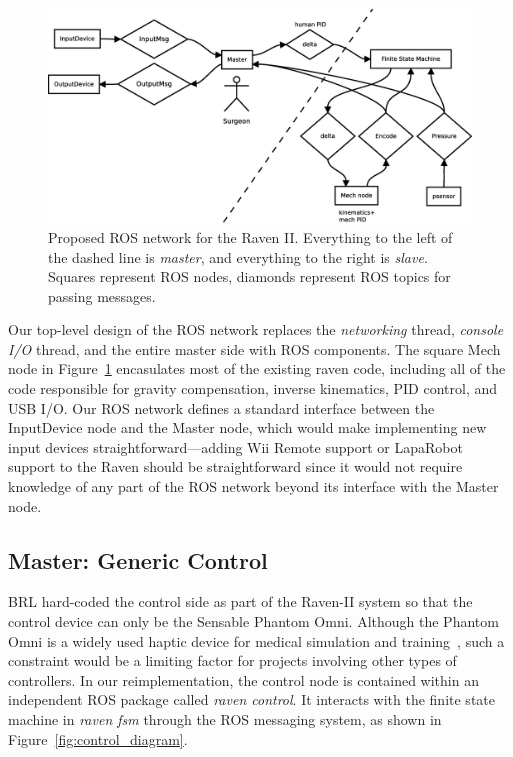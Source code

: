 \documentclass[letterpaper,twocolumn,10pt]{article}
\begin{document}
\begin{figure}[t]
  \begin{center}
    \includegraphics[width=1.0\textwidth]{ros_high_level_v2.eps}
  \end{center}
  \caption{Proposed ROS network for the Raven II. Everything to the
    left of the dashed line is \emph{master}, and everything to the
    right is \emph{slave}. Squares represent ROS nodes, diamonds
    represent ROS topics for passing messages.}
  \label{fig:ros_network}
\end{figure}

Our top-level design of the ROS network replaces the \emph{networking}
thread, \emph{console I/O} thread, and the entire master side with ROS
components. The square Mech node in Figure~\ref{fig:ros_network}
encasulates most of the existing raven code, including all of the code
responsible for gravity compensation, inverse kinematics, PID control,
and USB I/O. Our ROS network defines a standard interface between the
InputDevice node and the Master node, which would make implementing
new input devices straightforward---adding Wii Remote support or
LapaRobot support to the Raven should be straightforward since it
would not require knowledge of any part of the ROS network beyond its
interface with the Master node.

\subsection{Master: Generic Control}

BRL hard-coded the control side as part of the Raven-II system so that
the control device can only be the Sensable Phantom Omni. Although the
Phantom Omni is a widely used haptic device for medical simulation and
training~\cite{2}, such a constraint would be a limiting factor for projects
involving other types of controllers. In our reimplementation, the
control node is contained within an independent ROS package called
\emph{raven control}. It interacts with the finite state machine in
\emph{raven fsm} through the ROS messaging system, as shown in
Figure~\ref{fig:control_diagram}.
\end{document}

